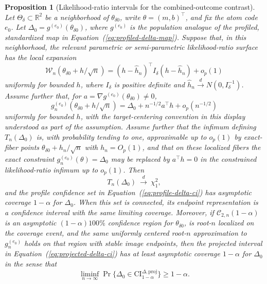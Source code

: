 \documentclass[11pt]{article}
\newtheorem{proposition}{Proposition}
\begin{document}
\begin{proposition}[Likelihood-ratio intervals for the combined-outcome contrast]\label{prop:delta-lr-intervals}
Let $\Theta_\delta\subset\mathbb R^2$ be a neighborhood of $\theta_{\delta0}$, write $\theta=(m,b)^\top$, and fix the atom code $e_0$. Let $\Delta_0=g^{(e_0)}(\theta_{\delta0})$, where $g^{(e_0)}$ is the population analogue of the profiled, standardized map in Equation~(\ref{eq:profiled-delta-map}). Suppose that, in this neighborhood, the relevant parametric or semi-parametric likelihood-ratio surface has the local expansion
\[
  \mathcal W_n(\theta_{\delta0}+h/\sqrt n)
  =
  (h-\widehat h_n)^\top I_\delta(h-\widehat h_n)+o_p(1)
\]
uniformly for bounded $h$, where $I_\delta$ is positive definite and $\widehat h_n\overset{d}{\to}N(0,I_\delta^{-1})$. Assume further that, for $a=\nabla g^{(e_0)}(\theta_{\delta0})\neq0$,
\[
  g_n^{(e_0)}(\theta_{\delta0}+h/\sqrt n)
  =
  \Delta_0+n^{-1/2}a^\top h+o_p(n^{-1/2})
\]
uniformly for bounded $h$, with the target-centering convention in this display understood as part of the assumption. Assume further that the infimum defining $T_n(\Delta_0)$ is, with probability tending to one, approximable up to $o_p(1)$ by exact-fiber points $\theta_{\delta0}+h_n/\sqrt n$ with $h_n=O_p(1)$, and that on these localized fibers the exact constraint $g_n^{(e_0)}(\theta)=\Delta_0$ may be replaced by $a^\top h=0$ in the constrained likelihood-ratio infimum up to $o_p(1)$. Then
\[
  T_n(\Delta_0)\ \overset{d}{\longrightarrow}\ \chi^2_1,
\]
and the profile confidence set in Equation~(\ref{eq:profile-delta-ci}) has asymptotic coverage $1-\alpha$ for $\Delta_0$. When this set is connected, its endpoint representation is a confidence interval with the same limiting coverage. Moreover, if $\mathcal{C}_{2,n}(1-\alpha)$ is an asymptotic $(1-\alpha)100\%$ confidence region for $\theta_{\delta0}$, is root-$n$ localized on the coverage event, and the same uniformly centered root-$n$ approximation to $g_n^{(e_0)}$ holds on that region with stable image endpoints, then the projected interval in Equation~(\ref{eq:projected-delta-ci}) has at least asymptotic coverage $1-\alpha$ for $\Delta_0$ in the sense that
\[
  \liminf_{n\to\infty}
  \Pr\{\Delta_0\in\mathrm{CI}^{\Delta,\mathrm{proj}}_{1-\alpha}\}
  \ge 1-\alpha .
\]
\end{proposition}
\end{document}
